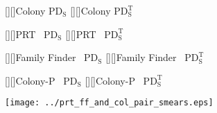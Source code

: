 \documentclass[11pt]{article}
\newcommand{\PDS}{\mathrm{PD_S}}
\newcommand{\PDST}{\mathrm{PD_S^T}}
\begin{document}
\pagestyle{empty}

\begin{center}
[][]{{\sf Colony} $\PDS$}
[][]{{\sf Colony} $\PDST$}

[][]{{\sf PRT~} $\PDS$}
[][]{{\sf PRT~} $\PDST$}

[][]{{\sf Family Finder~} $\PDS$}
[][]{{\sf Family Finder~} $\PDST$}

[][]{{\sf Colony-P~} $\PDS$}
[][]{{\sf Colony-P~} $\PDST$}


\texttt{[image: ../prt\_ff\_and\_col\_pair\_smears.eps]}

\end{center}




 
\end{document}
